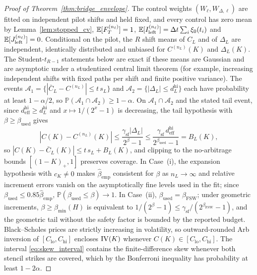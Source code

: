\begin{proof}[Proof of Theorem~\ref{thm:bridge_envelope}]
The control weights $(W_\ell,W_{\Delta,\ell})$ are fitted on independent pilot shifts and held fixed, and every control has zero mean by Lemma~\ref{lem:stopped_cv}, $\mathbb{E}[F_T^{(n_\ell)}]=1$, $\mathbb{E}[I_{\mathrm{left}}^{(n_\ell)}]=\Delta t\sum_i\xi_0(t_i)$ and $\mathbb{E}[J_{\mathrm{left}}^{(n_\ell)}]=0$. Conditional on the pilot, the $R$ shift means of $C_L$ and of $\Delta_L$ are independent, identically distributed and unbiased for $C^{(n_L)}(K)$ and $\Delta_L(K)$. The Student-$t_{R-1}$ statements below are exact if these means are Gaussian and are asymptotic under a studentized central limit theorem (for example, increasing independent shifts with fixed paths per shift and finite positive variance). The events $\mathcal{A}_1=\{|\bar{C}_L - C^{(n_L)}| \le t\,s_L\}$ and $\mathcal{A}_2=\{|\Delta_L| \le d_L^{\mathrm{hi}}\}$ each have probability at least $1-\alpha/2$, so $\mathbb{P}(\mathcal{A}_1\cap\mathcal{A}_2)\ge 1-\alpha$. On $\mathcal{A}_1\cap\mathcal{A}_2$ and the stated tail event, since $d_{\mathrm{eff}}^{\mathrm{hi}}\ge d_L^{\mathrm{hi}}$ and $x\mapsto1/(2^x-1)$ is decreasing, the tail hypothesis with $\beta\ge\beta_{\mathrm{used}}$ gives
\[
  |C(K)-C^{(n_L)}(K)|\le\frac{\gamma_{\mathrm{sf}}|\Delta_L|}{2^\beta-1}\le\frac{\gamma_{\mathrm{sf}}\,d_{\mathrm{eff}}^{\mathrm{hi}}}{2^{\beta_{\mathrm{used}}}-1}=B_L(K),
\]
so $|C(K)-\bar{C}_L(K)|\le t\,s_L + B_L(K)$, and clipping to the no-arbitrage bounds $[(1-K)_+,1]$ preserves coverage. In Case~(i), the expansion hypothesis with $c_K\ne0$ makes $\hat{\beta}_{\mathrm{emp}}$ consistent for $\beta$ as $n_L\to\infty$ and relative increment errors vanish on the asymptotically fine levels used in the fit; since $\beta_{\mathrm{used}}\le0.85\hat{\beta}_{\mathrm{emp}}$, $\mathbb{P}(\beta_{\mathrm{used}}\le\beta)\to1$. In Case~(ii), $\beta_{\mathrm{used}}=\beta_{\mathrm{FSW}}$; under geometric increments, $\beta\ge\beta_{\min}(H)$ is equivalent to $1/(2^\beta-1)\le\gamma_{\mathrm{sf}}/(2^{\beta_{\mathrm{FSW}}}-1)$, and the geometric tail without the safety factor is bounded by the reported budget. Black--Scholes prices are strictly increasing in volatility, so outward-rounded Arb inversion of $[C_{\mathrm{lo}},C_{\mathrm{hi}}]$ encloses $\mathrm{IV}(K)$ whenever $C(K)\in[C_{\mathrm{lo}},C_{\mathrm{hi}}]$. The interval \eqref{eq:skew_interval} contains the finite-difference skew whenever both stencil strikes are covered, which by the Bonferroni inequality has probability at least $1-2\alpha$.
\end{proof}
